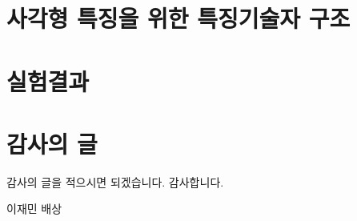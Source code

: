 \documentclass[master,korean,final]{cbnu-ecs}
\begin{document}
\chapter{사각형 특징을 위한 특징기술자 구조}
\chapter{실험결과}


%
%
%


\chapter*{감사의 글}

감사의 글을 적으시면 되겠습니다.
감사합니다.

\begin{flushright}
\vspace{1cm}
이재민 배상
\end{flushright}
\end{document}
